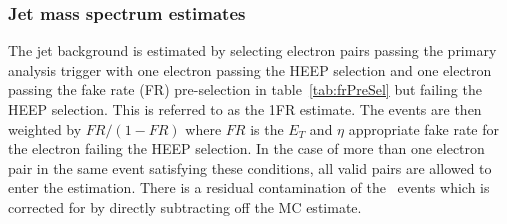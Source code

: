 %
%
%



\subsubsection{Jet mass spectrum estimates}

The jet background is estimated by selecting electron pairs passing the primary analysis trigger with one electron passing the HEEP selection and one electron passing the fake rate (FR) pre-selection in table~\ref{tab:frPreSel} but failing the HEEP selection. This is referred to as the 1FR estimate.
The events are then weighted by $FR/(1-FR)$ where $FR$ is the $E_T$ and $\eta$ appropriate fake rate for the electron failing the HEEP selection. In the case of more than one electron pair in the same event satisfying these conditions, all valid pairs are allowed to enter the estimation. There is a residual contamination of the \zee\ events which is corrected for by directly subtracting off the MC estimate.%

